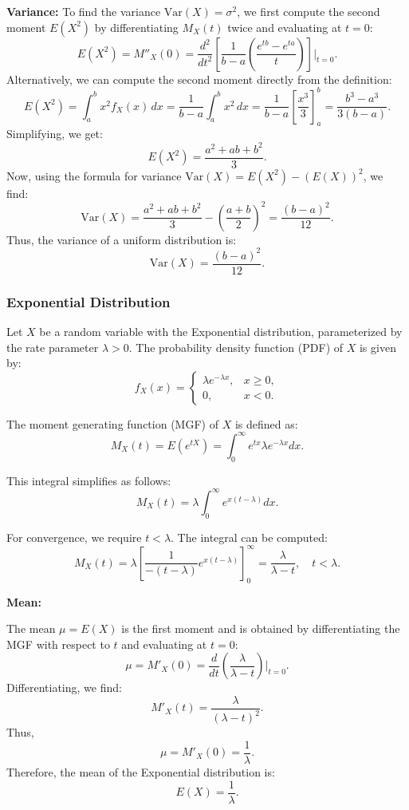 \textbf{Variance:} To find the variance \( \text{Var}(X) = \sigma^2 \), we first compute the second moment \( E(X^2) \) by differentiating \( M_X(t) \) twice and evaluating at \( t = 0 \):
\[
E(X^2) = M''_X(0) = \frac{d^2}{dt^2} \left[ \frac{1}{b-a} \left( \frac{e^{tb} - e^{ta}}{t} \right) \right] \bigg|_{t=0}.
\]
Alternatively, we can compute the second moment directly from the definition:
\[
E(X^2) = \int_a^b x^2 f_X(x) \, dx = \frac{1}{b-a} \int_a^b x^2 \, dx = \frac{1}{b-a} \left[ \frac{x^3}{3} \right]_a^b = \frac{b^3 - a^3}{3(b-a)}.
\]
Simplifying, we get:
\[
E(X^2) = \frac{a^2 + ab + b^2}{3}.
\]
Now, using the formula for variance \( \text{Var}(X) = E(X^2) - (E(X))^2 \), we find:
\[
\text{Var}(X) = \frac{a^2 + ab + b^2}{3} - \left( \frac{a+b}{2} \right)^2 = \frac{(b-a)^2}{12}.
\]
Thus, the variance of a uniform distribution is:
\[
\text{Var}(X) = \frac{(b-a)^2}{12}.
\]

\subsubsection{Exponential Distribution}

Let \( X \) be a random variable with the Exponential distribution, parameterized by the rate parameter \( \lambda > 0 \). The probability density function (PDF) of \( X \) is given by:
\[
f_X(x) =
\begin{cases}
\lambda e^{-\lambda x}, & x \geq 0, \\
0, & x < 0.
\end{cases}
\]

The moment generating function (MGF) of \( X \) is defined as:
\[
M_X(t) = E\left(e^{tX}\right) = \int_0^\infty e^{tx} \lambda e^{-\lambda x} dx.
\]

This integral simplifies as follows:
\[
M_X(t) = \lambda \int_0^\infty e^{x(t - \lambda)} dx.
\]

For convergence, we require \( t < \lambda \). The integral can be computed:
\[
M_X(t) = \lambda \left[ \frac{1}{-(t - \lambda)} e^{x(t - \lambda)} \right]_0^\infty = \frac{\lambda}{\lambda - t}, \quad t < \lambda.
\]

\textbf{Mean:}


The mean \( \mu = E(X) \) is the first moment and is obtained by differentiating the MGF with respect to \( t \) and evaluating at \( t = 0 \):
\[
\mu = M'_X(0) = \frac{d}{dt} \left(\frac{\lambda}{\lambda - t}\right) \bigg|_{t=0}.
\]
Differentiating, we find:
\[
M'_X(t) = \frac{\lambda}{(\lambda - t)^2}.
\]
Thus,
\[
\mu = M'_X(0) = \frac{1}{\lambda}.
\]
Therefore, the mean of the Exponential distribution is:
\[
E(X) = \frac{1}{\lambda}.
\]

